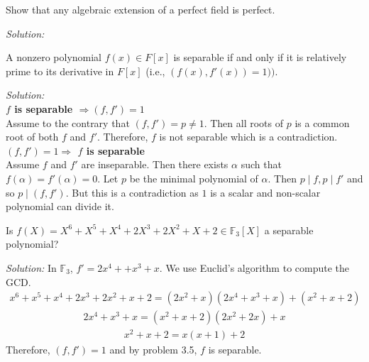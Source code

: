 \documentclass[a4paper, 11pt]{article}
\newenvironment{solution}
    {\textit{Solution:}}
    {}
\begin{document}
\begin{tcolorbox}[colback=c2,colframe=c1,title=Problem 3.4]
    Show that any algebraic extension of a perfect field is perfect.
\end{tcolorbox}
\begin{solution}
    
\end{solution}






\begin{tcolorbox}[colback=c2,colframe=c1,title=Problem 3.5]
    A nonzero polynomial $f(x) \in F[x]
    $ is separable if and only if it is relatively
prime to its derivative in $F[x]$ (i.e., $(f(x), f'
(x)) = 1))$.
\end{tcolorbox}
\begin{solution}\\
    \textbf{$f$ is separable $\Rightarrow(f,f')=1$}\\
    Assume to the contrary that  $(f,f')=p\ne 1$. Then all roots of $p$ is a common root of both $f$ and $f'$. Therefore, $f$ is not separable which is a contradiction.\\

    \noindent\textbf{$(f,f')=1\Rightarrow$ $f$ is separable}\\
    Assume $f$ and $f'$ are inseparable. Then there exists $\alpha$ such that $f(\alpha)=f'(\alpha)=0$. Let $p$ be the minimal polynomial of $\alpha$. Then $p\mid f,p\mid f'$ and so $p\mid (f,f')$. But this is a contradiction as $1$ is a scalar and non-scalar polynomial can divide it. 
\end{solution}








\begin{tcolorbox}[colback=c2,colframe=c1,title=Problem 3.6]
    Is $f(X) = X^6+X^5+X^4+2X^3+2X^2+X +2 \in\mathbb F_3[X]$ a separable polynomial?
\end{tcolorbox}
\begin{solution}
    In $\mathbb{F}_3$, $f'=2x^4++x^3+x$. We use Euclid's algorithm to compute the GCD.
    \begin{align*}
        x^6+x^5+x^4+2x^3+2x^2+x+2=(2x^2+x)(2x^4+x^3+x)+(x^2+x+2)
    \end{align*}
    \begin{align*}
        2x^4+x^3+x=(x^2+x+2)(2x^2+2x)+x
    \end{align*}
    \begin{align*}
        x^2+x+2=x(x+1)+2
    \end{align*}
    Therefore, $(f,f')=1$ and by problem 3.5, $f$ is separable.
\end{solution}
\end{document}
